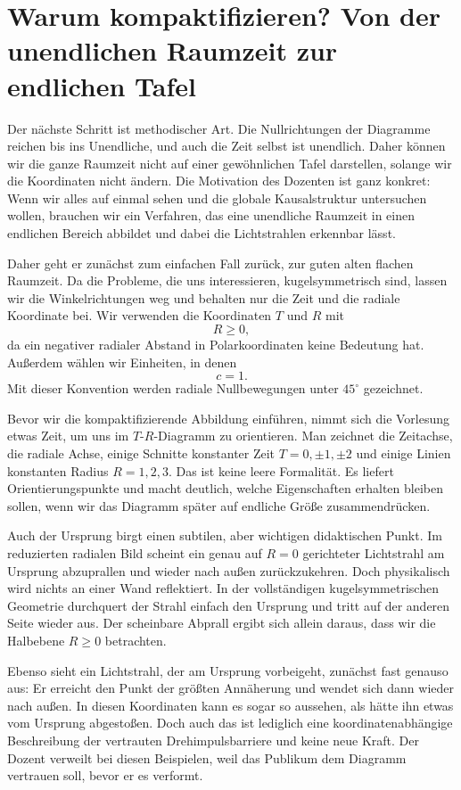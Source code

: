 \section{Warum kompaktifizieren? Von der unendlichen Raumzeit zur endlichen Tafel}

Der nächste Schritt ist methodischer Art. Die Nullrichtungen der Diagramme reichen bis ins Unendliche, und auch die Zeit selbst ist unendlich. Daher können wir die ganze Raumzeit nicht auf einer gewöhnlichen Tafel darstellen, solange wir die Koordinaten nicht ändern. Die Motivation des Dozenten ist ganz konkret: Wenn wir alles auf einmal sehen und die globale Kausalstruktur untersuchen wollen, brauchen wir ein Verfahren, das eine unendliche Raumzeit in einen endlichen Bereich abbildet und dabei die Lichtstrahlen erkennbar lässt.

Daher geht er zunächst zum einfachen Fall zurück, zur guten alten flachen Raumzeit. Da die Probleme, die uns interessieren, kugelsymmetrisch sind, lassen wir die Winkelrichtungen weg und behalten nur die Zeit und die radiale Koordinate bei. Wir verwenden die Koordinaten \(T\) und \(R\) mit
\[
R\ge 0,
\]
da ein negativer radialer Abstand in Polarkoordinaten keine Bedeutung hat. Außerdem wählen wir Einheiten, in denen
\[
c=1.
\]
Mit dieser Konvention werden radiale Nullbewegungen unter \(45^\circ\) gezeichnet.

Bevor wir die kompaktifizierende Abbildung einführen, nimmt sich die Vorlesung etwas Zeit, um uns im \(T\)-\(R\)-Diagramm zu orientieren. Man zeichnet die Zeitachse, die radiale Achse, einige Schnitte konstanter Zeit \(T=0,\pm1,\pm2\) und einige Linien konstanten Radius \(R=1,2,3\). Das ist keine leere Formalität. Es liefert Orientierungspunkte und macht deutlich, welche Eigenschaften erhalten bleiben sollen, wenn wir das Diagramm später auf endliche Größe zusammendrücken.

Auch der Ursprung birgt einen subtilen, aber wichtigen didaktischen Punkt. Im reduzierten radialen Bild scheint ein genau auf \(R=0\) gerichteter Lichtstrahl am Ursprung abzuprallen und wieder nach außen zurückzukehren. Doch physikalisch wird nichts an einer Wand reflektiert. In der vollständigen kugelsymmetrischen Geometrie durchquert der Strahl einfach den Ursprung und tritt auf der anderen Seite wieder aus. Der scheinbare Abprall ergibt sich allein daraus, dass wir die Halbebene \(R\ge 0\) betrachten.

Ebenso sieht ein Lichtstrahl, der am Ursprung vorbeigeht, zunächst fast genauso aus: Er erreicht den Punkt der größten Annäherung und wendet sich dann wieder nach außen. In diesen Koordinaten kann es sogar so aussehen, als hätte ihn etwas vom Ursprung abgestoßen. Doch auch das ist lediglich eine koordinatenabhängige Beschreibung der vertrauten Drehimpulsbarriere und keine neue Kraft. Der Dozent verweilt bei diesen Beispielen, weil das Publikum dem Diagramm vertrauen soll, bevor er es verformt.

